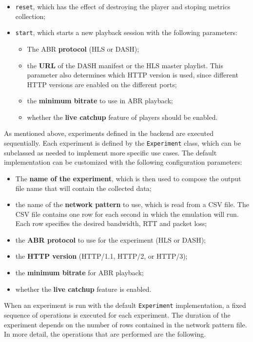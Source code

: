 \begin{itemize}
    \item \texttt{reset}, which has the effect of destroying the player and stoping metrics collection;
    \item \texttt{start}, which starts a new playback session with the following parameters:
    \begin{itemize}
        \item The ABR \textbf{protocol} (HLS or DASH);
        \item the \textbf{URL} of the DASH manifest or the HLS master playlist. This parameter also determines which HTTP version is used, since different HTTP versions are enabled on the different ports;
        \item the \textbf{minimum bitrate} to use in ABR playback;
        \item whether the \textbf{live catchup} feature of players should be enabled.
    \end{itemize}
\end{itemize}

As mentioned above, experiments defined in the backend are executed sequentially. Each experiment is defined by the \texttt{Experiment} class, which can be subclassed as needed to implement more specific use cases. The default implementation can be customized with the following configuration parameters:

\begin{itemize}
    \item The \textbf{name of the experiment}, which is then used to compose the output file name that will contain the collected data;
    \item the name of the \textbf{network pattern} to use, which is read from a CSV file. The CSV file contains one row for each second in which the emulation will run. Each row specifies the desired bandwidth, RTT and packet loss;
    \item the \textbf{ABR protocol} to use for the experiment (HLS or DASH);
    \item the \textbf{HTTP version} (HTTP/1.1, HTTP/2, or HTTP/3);
    \item the \textbf{minimum bitrate} for ABR playback;
    \item whether the \textbf{live catchup} feature is enabled.
\end{itemize}

When an experiment is run with the default \texttt{Experiment} implementation, a fixed sequence of operations is executed for each experiment. The duration of the experiment depends on the number of rows contained in the network pattern file. In more detail, the operations that are performed are the following.

